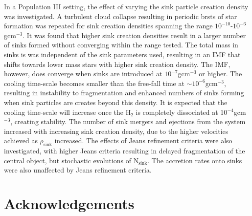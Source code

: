 \documentclass[fleqn,usenatbib]{mnras}
\begin{document}
In a Population III setting, the effect of varying the sink particle creation density was investigated. A turbulent cloud collapse resulting in periodic brsts of star formation was repeated for sink creation densities spanning the range $10^{-10}$-$10^{-6}$gcm$^{-3}$. It was found that higher sink creation densities result in a larger number of sinks formed without converging within the range tested. The total mass in sinks is was independent of the sink parameters used, resulting in an IMF that shifts towards lower mass stars with higher sink creation density. The IMF, however, does converge when sinks are introduced at $10^{-7}$gcm$^{-3}$ or higher. The cooling time-scale becomes smaller than the free-fall time at $\sim 10^{-6}$gcm$^{-3}$, resulting in instability to fragmentation and enhanced numbers of sinks forming when sink particles are creates beyond this density. It is expected that the cooling time-scale will increase once the H$_2$ is completely dissociated at 10$^{-4}$gcm$^{-3}$, creating stability. The number of sink mergers and ejections from the system increased with increasing sink creation density, due to the higher velocities achieved as $\rho_{\text{sink}}$ increased. The effects of Jeans refinement criteria were also investigated, with higher Jeans criteria resulting in delayed fragmentation of the central object, but stochastic evolutions of N$_{\text{sink}}$. The accretion rates onto sinks were also unaffected by Jeans refinement criteria.

\section*{Acknowledgements}





 






\newpage












\bsp	%
\label{lastpage}
\end{document}
